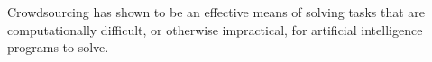 Crowdsourcing has shown to be an effective means of solving tasks that are computationally difficult, or otherwise impractical, for artificial intelligence programs to solve. 